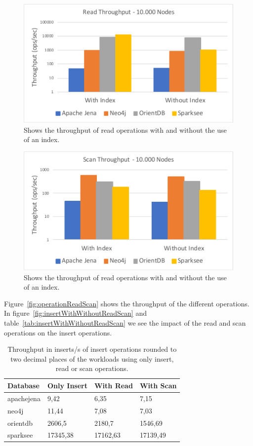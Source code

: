 \begin{figure}[h!]
  \centering
  \includegraphics[width=.75\textwidth]{images/responsiveness/readThroughput10000Nodes}
  \caption{Shows the throughput of read operations with and without the use of an index.}
  \label{fig:readThroughput10000Nodes}
\end{figure}

\begin{figure}[h!]
  \centering
  \includegraphics[width=.75\textwidth]{images/responsiveness/scanThroughput10000Nodes}
  \caption{Shows the throughput of read operations with and without the use of an index.}
  \label{fig:scanThroughput10000Nodes}
\end{figure}

Figure~\ref{fig:operationReadScan} shows the throughput of the different operations.
In figure~\ref{fig:insertWithWithoutReadScan} and table~\ref{tab:insertWithWithoutReadScan} we see the impact of the read and scan operations on the insert operations.

\begin{table}[h!]
  \begin{minipage}{\textwidth}
    \centering
    \begin{tabularx}{\textwidth}{ | l | X | X | X | }
      \hline
      Database & Only Insert & With Read & With Scan \\ \hline
      apachejena & 9,42 & 6,35 & 7,15 \\ \hline
      neo4j & 11,44 & 7,08 & 7,03 \\ \hline
      orientdb & 2606,5 & 2180,7 & 1546,69 \\ \hline
      sparksee & 17345,38 & 17162,63 & 17139,49 \\ \hline
    \end{tabularx}
  \end{minipage}
  \caption{Throughput in inserts/s of insert operations rounded to two decimal places of the workloads using only insert, read or scan operations.}
  \label{tab:scanThroughput10000Nodes}
\end{table}

